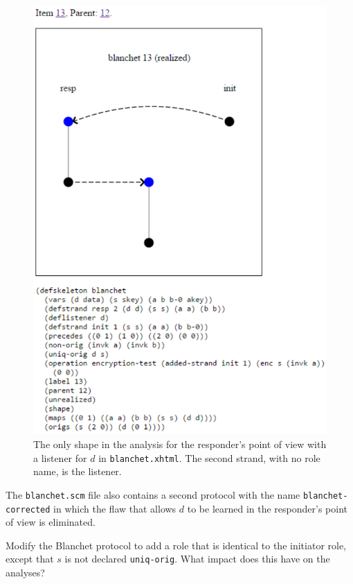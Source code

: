\begin{figure}
\centering
\includegraphics[scale=0.9]{blanchet_skel13}
\caption[Blanchet shape for responder's point of view]{The only shape
  in the analysis for the responder's point of view with a listener
  for $d$ in \texttt{blanchet.xhtml}.  The second strand, with no role
  name, is the listener. }
\label{fig:blanchet skel 13}
\end{figure}

The \texttt{blanchet.scm} file also contains a second protocol with
the name \texttt{blanchet-corrected} in which the flaw that allows $d$
to be learned in the responder's point of view is eliminated.

\begin{exercise}
  Modify the Blanchet protocol to add a role that is identical to the
  initiator role, except that $s$ is not declared \texttt{uniq-orig}.
  What impact does this have on the analyses?
\end{exercise}

